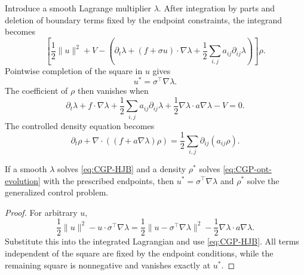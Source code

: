 Introduce a smooth Lagrange multiplier $\lambda$.  After integration by parts and deletion of
boundary terms fixed by the endpoint constraints, the integrand becomes
\[
 \left[\frac12\|u\|^2+V-
 \left(\partial_t\lambda+(f+\sigma u)\cdot\nabla\lambda
 +\frac12\sum_{i,j}a_{ij}\partial_{ij}\lambda\right)\right]\rho.
\]
Pointwise completion of the square in $u$ gives
\begin{equation}
 u^*=\sigma^\top\nabla\lambda. \label{eq:CGP-u-star}
\end{equation}
The coefficient of $\rho$ then vanishes when
\begin{equation}
 \partial_t\lambda+f\cdot\nabla\lambda
 +\frac12\sum_{i,j}a_{ij}\partial_{ij}\lambda
 +\frac12\nabla\lambda\cdot a\nabla\lambda-V=0.
 \label{eq:CGP-HJB}
\end{equation}
The controlled density equation becomes
\begin{equation}
 \partial_t\rho+\nabla\cdot((f+a\nabla\lambda)\rho)
 =\frac12\sum_{i,j}\partial_{ij}(a_{ij}\rho).
 \label{eq:CGP-opt-evolution}
\end{equation}

\begin{proposition}
If a smooth $\lambda$ solves \eqref{eq:CGP-HJB} and a density $\rho^*$ solves
\eqref{eq:CGP-opt-evolution} with the prescribed endpoints, then
$u^*=\sigma^\top\nabla\lambda$ and $\rho^*$ solve the generalized control problem.
\end{proposition}
\begin{proof}
For arbitrary $u$,
\[
 \frac12\|u\|^2-u\cdot\sigma^\top\nabla\lambda
 =\frac12\|u-\sigma^\top\nabla\lambda\|^2
 -\frac12\nabla\lambda\cdot a\nabla\lambda.
\]
Substitute this into the integrated Lagrangian and use \eqref{eq:CGP-HJB}.  All terms independent
of the square are fixed by the endpoint conditions, while the remaining square is nonnegative and
vanishes exactly at $u^*$.
\end{proof}

